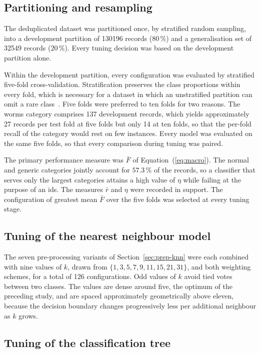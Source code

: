 \subsection{Partitioning and resampling}
\label{sec:partition}

The deduplicated dataset was partitioned once, by stratified random
sampling, into a development partition of \num{130196} records
($80\,\%$) and a generalisation set of \num{32549} records ($20\,\%$).
Every tuning decision was based on the development partition alone.

Within the development partition, every configuration was evaluated by
stratified five-fold cross-validation. Stratification preserves the class
proportions within every fold, which is necessary for a dataset in which an
unstratified partition can omit a rare class~\cite{kohavi1995}. Five folds
were preferred to ten folds for two reasons. The worms category comprises
137 development records, which yields approximately 27 records per test
fold at five folds but only 14 at ten folds, so that the per-fold recall of
the category would rest on few instances. Every model was evaluated on the same five folds, so that every
comparison during tuning was paired.

The primary performance measure was $\bar{F}$ of
Equation~(\ref{eq:macro}). The normal and generic categories jointly account
for $57.3\,\%$ of the records, so a classifier that serves only the largest
categories attains a high value of $\eta$ while failing at the purpose of
an \gls{ids}. The measures $\bar{r}$ and $\eta$ were recorded in support. The
configuration of greatest mean $\bar{F}$ over the five folds was selected
at every tuning stage.

\subsection{Tuning of the nearest neighbour model}
\label{sec:tune-knn}

The seven pre-processing variants of Section~\ref{sec:prep-knn} were each
combined with nine values of $k$, drawn from
$\{1, 3, 5, 7, 9, 11, 15, 21, 31\}$, and both weighting schemes, for a total
of 126 configurations. Odd values of $k$ avoid tied votes between two
classes. The values are dense around five, the optimum of the preceding
study, and are spaced approximately geometrically above eleven, because the
decision boundary changes progressively less per additional neighbour as
$k$ grows.

\subsection{Tuning of the classification tree}
\label{sec:tune-tree}

